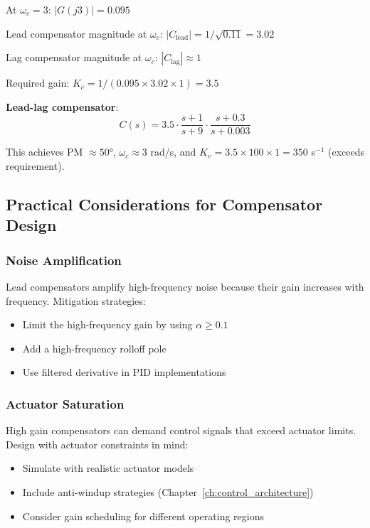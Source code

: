 \begin{example}
At $\omega_c = 3$: $|G(j3)| = 0.095$

Lead compensator magnitude at $\omega_c$: $|C_{\text{lead}}| = 1/\sqrt{0.11} = 3.02$

Lag compensator magnitude at $\omega_c$: $|C_{\text{lag}}| \approx 1$

Required gain: $K_c = 1/(0.095 \times 3.02 \times 1) = 3.5$

\textbf{Lead-lag compensator}:
\begin{equation}
C(s) = 3.5 \cdot \frac{s + 1}{s + 9} \cdot \frac{s + 0.3}{s + 0.003}
\end{equation}

This achieves PM $\approx 50°$, $\omega_c \approx 3$ rad/s, and $K_v = 3.5 \times 100 \times 1 = 350$ s$^{-1}$ (exceeds requirement).
\end{example}

\subsection{Practical Considerations for Compensator Design}
\label{subsec:compensator_practical}

\subsubsection{Noise Amplification}

Lead compensators amplify high-frequency noise because their gain increases with frequency. Mitigation strategies:
\begin{itemize}
    \item Limit the high-frequency gain by using $\alpha \geq 0.1$
    \item Add a high-frequency rolloff pole
    \item Use filtered derivative in PID implementations
\end{itemize}

\subsubsection{Actuator Saturation}

High gain compensators can demand control signals that exceed actuator limits. Design with actuator constraints in mind:
\begin{itemize}
    \item Simulate with realistic actuator models
    \item Include anti-windup strategies (Chapter~\ref{ch:control_architecture})
    \item Consider gain scheduling for different operating regions
\end{itemize}

